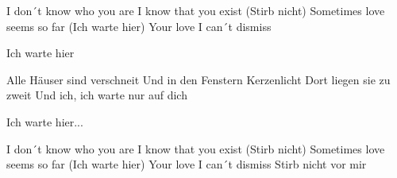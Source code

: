 \documentclass[../../../songbook.tex]{subfiles}
\begin{document}
I don´t know who you are						 \newline
I know that you exist (Stirb nicht)				 \newline
Sometimes love seems so far (Ich warte hier)	 \newline
Your love I can´t dismiss						 \newline

Ich warte hier	 	 \newline

Alle Häuser sind verschneit				 \newline
Und in den Fenstern Kerzenlicht			 \newline
Dort liegen sie zu zweit				 \newline
Und ich, ich warte nur auf dich			 \newline

\-\hspace{1cm} Ich warte hier...		\newline

I don´t know who you are						 \newline
I know that you exist (Stirb nicht)				 \newline
Sometimes love seems so far (Ich warte hier)	 \newline
Your love I can´t dismiss						 \newline
Stirb nicht vor mir								 
\end{document}
